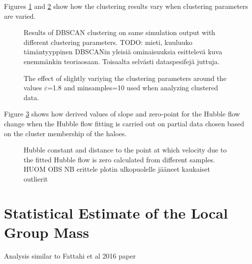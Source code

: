 \documentclass[english, oneside]{HYgradu}
\begin{document}
\reversemarginpar
{}
Figures \ref{fig:clusteringExamples} and \ref{fig:clusteringvariations} show how the clustering results vary when clustering parameters are varied.

\begin{figure}
    \centering
    
    \caption{Results of DBSCAN clustering on same simulation output with different clustering parameters. TODO: mieti, kuuluuko tämäntyyppinen DBSCANin yleisiä ominaisuuksia esittelevä kuva enemmänkin teoriaosaan. Toisaalta selvästi dataspesifejä juttuja.}\label{fig:clusteringExamples}
\end{figure}

\begin{figure}
    \centering
    
    \caption{The effect of slightly variying the clustering parameters around the values $\varepsilon$=1.8 and minsamples=10 used when analyzing clustered data.}\label{fig:clusteringvariations}
\end{figure}

\reversemarginpar
{}
Figure \ref{fig:clusteredHFparameters} shows how derived values of slope and zero-point for the Hubble flow change when the Hubble flow fitting is carried out on partial data chosen based on the cluster membership of the haloes.

\begin{figure}
    \centering
    
    \caption{Hubble constant and distance to the point at which velocity due to the fitted Hubble flow is zero calculated from different samples. HUOM OBS NB erittele plotin ulkopuolelle jääneet kaukaiset outlierit}\label{fig:clusteredHFparameters}
\end{figure}

\section{Statistical Estimate of the Local Group Mass}
Analysis similar to Fattahi et al 2016 paper



%
%
\end{document}
